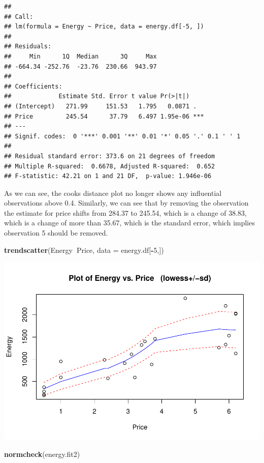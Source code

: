 \documentclass[]{article}
\newenvironment{Shaded}{\begin{snugshade}}{\end{snugshade}}
\newcommand{\DataTypeTok}[1]{\textcolor[rgb]{0.13,0.29,0.53}{#1}}
\newcommand{\DecValTok}[1]{\textcolor[rgb]{0.00,0.00,0.81}{#1}}
\newcommand{\KeywordTok}[1]{\textcolor[rgb]{0.13,0.29,0.53}{\textbf{#1}}}
\newcommand{\NormalTok}[1]{#1}
\newcommand{\OperatorTok}[1]{\textcolor[rgb]{0.81,0.36,0.00}{\textbf{#1}}}
\begin{document}
\begin{verbatim}
## 
## Call:
## lm(formula = Energy ~ Price, data = energy.df[-5, ])
## 
## Residuals:
##     Min      1Q  Median      3Q     Max 
## -664.34 -252.76  -23.76  230.66  943.97 
## 
## Coefficients:
##             Estimate Std. Error t value Pr(>|t|)    
## (Intercept)   271.99     151.53   1.795   0.0871 .  
## Price         245.54      37.79   6.497 1.95e-06 ***
## ---
## Signif. codes:  0 '***' 0.001 '**' 0.01 '*' 0.05 '.' 0.1 ' ' 1
## 
## Residual standard error: 373.6 on 21 degrees of freedom
## Multiple R-squared:  0.6678, Adjusted R-squared:  0.652 
## F-statistic: 42.21 on 1 and 21 DF,  p-value: 1.946e-06
\end{verbatim}

As we can see, the cooks distance plot no longer shows any influential
observations above 0.4. Similarly, we can see that by removing the
observation the estimate for price shifts from 284.37 to 245.54, which
is a change of 38.83, which is a change of more than 35.67, which is the
standard error, which implies observation 5 should be removed.

\begin{Shaded}
\begin{Highlighting}[]
\KeywordTok{trendscatter}\NormalTok{(Energy}\OperatorTok{~}\NormalTok{Price, }\DataTypeTok{data =}\NormalTok{ energy.df[}\OperatorTok{-}\DecValTok{5}\NormalTok{,])}
\end{Highlighting}
\end{Shaded}

\includegraphics{Engsci211assignment2_task2_files/figure-latex/unnamed-chunk-5-1.pdf}

\begin{Shaded}
\begin{Highlighting}[]
\KeywordTok{normcheck}\NormalTok{(energy.fit2)}
\end{Highlighting}
\end{Shaded}
\end{document}
